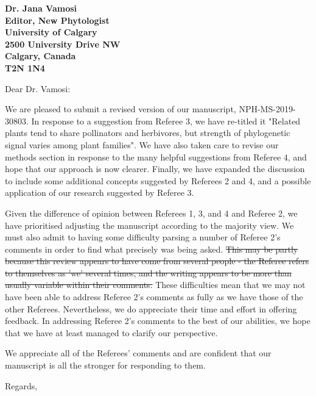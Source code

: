 \documentclass[12pt]{letter}
\providecommand{\DIFdel}[1]{{\protect\color{red}\sout{#1}}}                      %
\providecommand{\DIFdelbegin}{} %
\providecommand{\DIFdelend}{} %
\newcommand{\DIFscaledelfig}{0.5}
\newlength{\DIFdelgraphicswidth} %
\newlength{\DIFdelgraphicsheight} %
\newcommand{\DIFdelincludegraphics}[2][]{%
\sbox{\DIFdelgraphicsbox}{\DIFOincludegraphics[#1]{#2}}%
\settoboxwidth{\DIFdelgraphicswidth}{\DIFdelgraphicsbox} %
\settoboxtotalheight{\DIFdelgraphicsheight}{\DIFdelgraphicsbox} %
\scalebox{\DIFscaledelfig}{%
\parbox[b]{\DIFdelgraphicswidth}{\usebox{\DIFdelgraphicsbox}\\[-\baselineskip] \rule{\DIFdelgraphicswidth}{0em}}\llap{\resizebox{\DIFdelgraphicswidth}{\DIFdelgraphicsheight}{%
\setlength{\unitlength}{\DIFdelgraphicswidth}%
\begin{picture}(1,1)%
\thicklines\linethickness{2pt} %
{\color[rgb]{1,0,0}\put(0,0){\framebox(1,1){}}}%
{\color[rgb]{1,0,0}\put(0,0){\line( 1,1){1}}}%
{\color[rgb]{1,0,0}\put(0,1){\line(1,-1){1}}}%
\end{picture}%
}\hspace*{3pt}}} %
} %
\DeclareRobustCommand{\DIFdelbegin}{\DIFOdelbegin \let\includegraphics\DIFdelincludegraphics} %
\DeclareRobustCommand{\DIFdelend}{\DIFOaddend \let\includegraphics\DIFOincludegraphics} %
\begin{document}
\begin{letter}{\bf Dr. Jana Vamosi\\
               Editor, New Phytologist\\
               University of Calgary\\
               2500 University Drive NW\\
               Calgary, Canada\\
               T2N 1N4\\
                }

\opening{Dear Dr. Vamosi:}

	We are pleased to submit a revised version of our manuscript, NPH-MS-2019-30803. In response to a suggestion from Referee 3, we have re-titled it "Related plants tend to share pollinators and herbivores, but strength of phylogenetic signal varies among plant families". We have also taken care to revise our methods section in response to the many helpful suggestions from Referee 4, and hope that our approach is now clearer. Finally, we have expanded the discussion to include some additional concepts suggested by Referees 2 and 4, and a possible application of our research suggested by Referee 3. 


	Given the difference of opinion between Referees 1, 3, and 4 and Referee 2, we have prioritised adjusting the manuscript according to the majority view. We must also admit to having some difficulty parsing a number of Referee 2's comments in order to find what precisely was being asked. \DIFdelbegin \DIFdel{This may be partly because this review appears to have come from several people - the Referee refers to themselves as 'we' several times, and the writing appears to be more than usually variable within their comments. }\DIFdelend These difficulties mean that we may not have been able to address Referee 2's comments as fully as we have those of the other Referees. Nevertheless, we do appreciate their time and effort in offering feedback. In addressing Referee 2's comments to the best of our abilities, we hope that we have at least managed to clarify our perspective.


	We appreciate all of the Referees' comments and are confident that our manuscript is all the stronger for responding to them.


\closing{Regards,}


\end{letter}

\newpage

\setcounter{page}{1}
\end{document}
